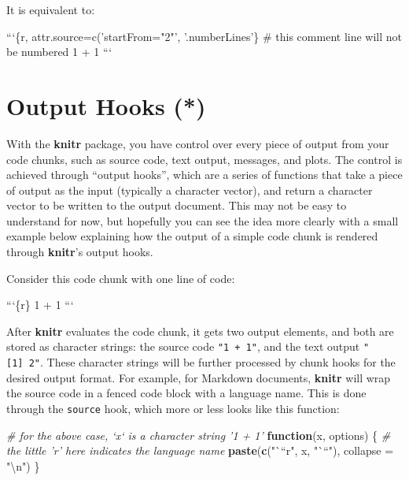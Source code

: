 \documentclass[
  11pt,
]{krantz}
\newenvironment{Shaded}{\begin{snugshade}}{\end{snugshade}}
\newcommand{\BaseNTok}[1]{\textcolor[rgb]{0.06,0.06,0.06}{#1}}
\newcommand{\CharTok}[1]{\textcolor[rgb]{0.5,0.5,0.5}{#1}}
\newcommand{\CommentTok}[1]{\textcolor[rgb]{0.37,0.37,0.37}{\textit{#1}}}
\newcommand{\ControlFlowTok}[1]{\textcolor[rgb]{0.27,0.27,0.27}{\textbf{#1}}}
\newcommand{\DataTypeTok}[1]{\textcolor[rgb]{0.27,0.27,0.27}{#1}}
\newcommand{\KeywordTok}[1]{\textcolor[rgb]{0.27,0.27,0.27}{\textbf{#1}}}
\newcommand{\NormalTok}[1]{#1}
\newcommand{\StringTok}[1]{\textcolor[rgb]{0.5,0.5,0.5}{#1}}
\begin{document}
It is equivalent to:

\begin{Shaded}
\begin{Highlighting}[]
\BaseNTok{```\{r, attr.source=c('startFrom="2"', '.numberLines'\}}
\BaseNTok{# this comment line will not be numbered}
\BaseNTok{1 + 1}
\BaseNTok{```}
\end{Highlighting}
\end{Shaded}

\hypertarget{output-hooks}{%
\chapter{Output Hooks (*)}\label{output-hooks}}

With the \textbf{knitr} package, you have control over every piece of output from your code chunks, such as source code, text output, messages, and plots. The control is achieved through ``output hooks'', which are a series of functions that take a piece of output as the input (typically a character vector), and return a character vector to be written to the output document. This may not be easy to understand for now, but hopefully you can see the idea more clearly with a small example below explaining how the output of a simple code chunk is rendered through \textbf{knitr}'s output hooks.

Consider this code chunk with one line of code:

\begin{Shaded}
\begin{Highlighting}[]
\BaseNTok{```\{r\}}
\BaseNTok{1 + 1}
\BaseNTok{```}
\end{Highlighting}
\end{Shaded}

After \textbf{knitr} evaluates the code chunk, it gets two output elements, and both are stored as character strings: the source code \texttt{"1\ +\ 1"}, and the text output \texttt{"{[}1{]}\ 2"}. These character strings will be further processed by chunk hooks for the desired output format. For example, for Markdown documents, \textbf{knitr} will wrap the source code in a fenced code block with a language name. This is done through the \texttt{source} hook, which more or less looks like this function:

\begin{Shaded}
\begin{Highlighting}[]
\CommentTok{# for the above case, `x` is a character string '1 + 1'}
\ControlFlowTok{function}\NormalTok{(x, options) \{}
  \CommentTok{# the little 'r' here indicates the language name}
  \KeywordTok{paste}\NormalTok{(}\KeywordTok{c}\NormalTok{(}\StringTok{"```r"}\NormalTok{, x, }\StringTok{"```"}\NormalTok{), }\DataTypeTok{collapse =} \StringTok{"}\CharTok{\textbackslash{}n}\StringTok{"}\NormalTok{)}
\NormalTok{\}}
\end{Highlighting}
\end{Shaded}
\end{document}
